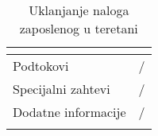 \documentclass[../main.tex]{subfiles}
\begin{document}
\begin{longtable}{| p{} | p{} |}
\begin{itemize}
    \end{itemize}\\
\hline
    Podtokovi & /\\
\hline
    Specijalni zahtevi & /\\
\hline
    Dodatne informacije & /\\
\hline
\caption{Uklanjanje naloga zaposlenog u teretani} %
\end{longtable}
\end{document}
